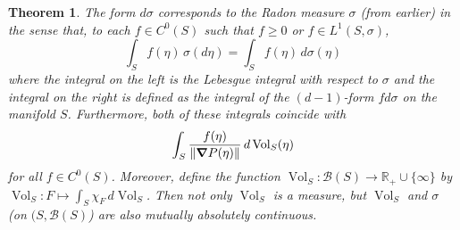 \documentclass{article}
\newcommand{\R}{\mathbb{R}}
\theoremstyle{theorem}
\newtheorem{theorem}{Theorem}[section]
\newcommand{\Vol}{\operatorname{Vol}}
\begin{document}
\begin{theorem}
The form $d\sigma$ corresponds to the Radon measure $\sigma$ (from earlier) in the sense that, to each $f\in C^0(S)$ such that $f \geq 0$ or $f \in L^1(S,\sigma)$,
\begin{equation}\label{eq:dSigmadSigma}
\int_S f(\eta)\,\sigma(d\eta)=\int_S f(\eta)\,d\sigma(\eta)
\end{equation}
where the integral on the left is the Lebesgue integral with respect to $\sigma$ and the integral on the right is defined as the integral of the $(d-1)$-form $f d\sigma$ on the manifold $S$. Furthermore, both of these integrals coincide with 
\begin{equation}\label{eq:dVolSGradP}
\int_S \frac{f(\eta)}{\norm{\grad P(\eta)}}\,d\Vol_S(\eta)
\end{equation}
for all $f\in C^0(S)$. Moreover, define the function $\Vol_S : \mathcal{B}(S) \to \R_+ \cup \{\infty\}$ by $\Vol_S : F \mapsto \int_S \chi_F \, d\Vol_S$. Then not only $\Vol_S$ is a measure, but $\Vol_S$ and $\sigma$ (on $(S,\mathcal{B}(S)$) are also mutually absolutely continuous. 
\end{theorem}
\end{document}
